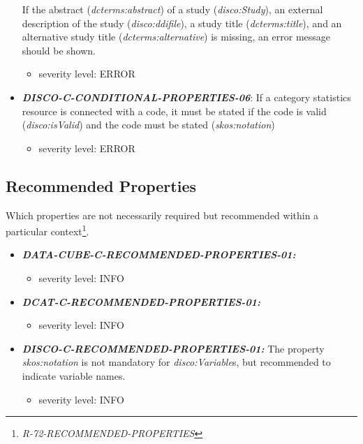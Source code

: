 \documentclass{llncs}
\begin{document}
\begin{itemize}
	If the abstract (\emph{dcterms:abstract}) of a study (\emph{disco:Study}), an external description of the study (\emph{disco:ddifile}), 
	a study title (\emph{dcterms:title}), and an alternative study title (\emph{dcterms:alternative}) is missing, an error message should be shown.
	\begin{itemize}
		\item severity level: ERROR
	\end{itemize}
	\item \textbf{{\em DISCO-C-CONDITIONAL-PROPERTIES-06}}:
	If a category statistics resource is connected with a code, it must be stated if the code is valid (\emph{disco:isValid}) and the code must be stated (\emph{skos:notation})
	\begin{itemize}
		\item severity level: ERROR
	\end{itemize}
\end{itemize}

\subsection{Recommended Properties}

Which properties are not necessarily required but recommended within a particular context\footnote{{\em R-72-RECOMMENDED-PROPERTIES}}.

\begin{itemize}
	\item \textbf{{\em DATA-CUBE-C-RECOMMENDED-PROPERTIES-01:}}
	\begin{itemize}
		\item severity level: INFO
	\end{itemize}
\end{itemize}

\begin{itemize}
	\item \textbf{{\em DCAT-C-RECOMMENDED-PROPERTIES-01:}}
	\begin{itemize}
		\item severity level: INFO
	\end{itemize}
\end{itemize}

\begin{itemize}
	\item \textbf{{\em DISCO-C-RECOMMENDED-PROPERTIES-01:}}
  The property {\em skos:notation} is not mandatory for {\em disco:Variable}s, but recommended to indicate variable names.
	\begin{itemize}
		\item severity level: INFO
	\end{itemize}
\end{itemize}
\end{document}
